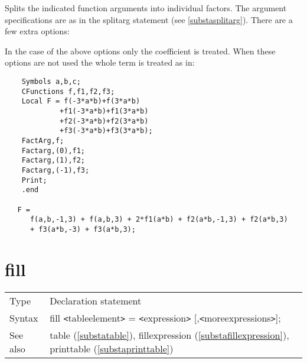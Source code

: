 \noindent Splits the indicated function arguments into individual factors. The argument specifications 
are as in the splitarg statement (see 
\ref{substasplitarg}). There are a few extra options:




\noindent In the case of the above options only the coefficient is treated. 
When these options are not used the whole term is treated as in:
\begin{verbatim}
    Symbols a,b,c;
    CFunctions f,f1,f2,f3;
    Local F = f(-3*a*b)+f(3*a*b)
             +f1(-3*a*b)+f1(3*a*b)
             +f2(-3*a*b)+f2(3*a*b)
             +f3(-3*a*b)+f3(3*a*b);
    FactArg,f;
    Factarg,(0),f1;
    Factarg,(1),f2;
    Factarg,(-1),f3;
    Print;
    .end

   F =
      f(a,b,-1,3) + f(a,b,3) + 2*f1(a*b) + f2(a*b,-1,3) + f2(a*b,3)
      + f3(a*b,-3) + f3(a*b,3);
\end{verbatim}
\vspace{10mm}


\section{fill}
\label{substafill}

\noindent \begin{tabular}{ll}
Type & Declaration statement\\
Syntax & fill {\tt<}tableelement{\tt>} = {\tt<}expression{\tt>} [,{\tt<}moreexpressions{\tt>}];
\\ See also & table (\ref{substatable}), 
                fillexpression (\ref{substafillexpression}),
                printtable (\ref{substaprinttable})
\end{tabular} \vspace{4mm}

